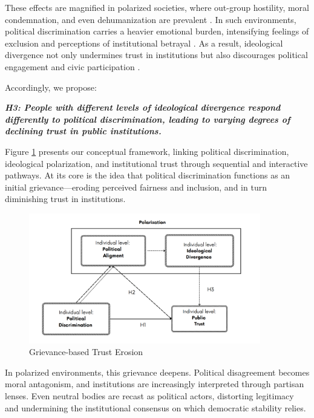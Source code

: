 \documentclass{article}
\begin{document}
These effects are magnified in polarized societies, where out-group hostility, moral condemnation, and even dehumanization are prevalent \parencite{iyengar_fear_2015}. In such environments, political discrimination carries a heavier emotional burden, intensifying feelings of exclusion and perceptions of institutional betrayal \parencite{hetherington_why_2015}. As a result, ideological divergence not only undermines trust in institutions but also discourages political engagement and civic participation \parencite{michelson_corrosive_2003, lelkes_limits_2017}.

Accordingly, we propose:

\emph{\textbf{\small
H3: People with different levels of ideological divergence respond differently to political discrimination, leading to varying degrees of declining trust in public institutions.
}}

Figure \ref{fig:0} presents our conceptual framework, linking political discrimination, ideological polarization, and institutional trust through sequential and interactive pathways. At its core is the idea that political discrimination functions as an initial grievance—eroding perceived fairness and inclusion, and in turn diminishing trust in institutions.

\begin{figure}[htbp]
\centering
\caption{Grievance-based Trust Erosion}
\label{fig:0}
\includegraphics[width=0.9\textwidth]{"viz/theoretical_diagram.png"}
\end{figure}

In polarized environments, this grievance deepens. Political disagreement becomes moral antagonism, and institutions are increasingly interpreted through partisan lenses. Even neutral bodies are recast as political actors, distorting legitimacy and undermining the institutional consensus on which democratic stability relies.
\end{document}
